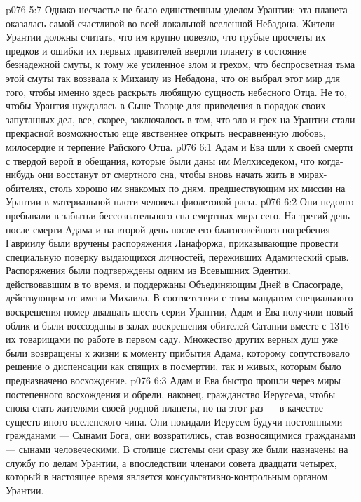 \vs p076 5:7 Однако несчастье не было единственным уделом Урантии; эта планета оказалась самой счастливой во всей локальной вселенной Небадона. Жители Урантии должны считать, что им крупно повезло, что грубые просчеты их предков и ошибки их первых правителей ввергли планету в состояние безнадежной смуты, к тому же усиленное злом и грехом, что беспросветная тьма этой смуты так воззвала к Михаилу из Небадона, что он выбрал этот мир для того, чтобы именно здесь раскрыть любящую сущность небесного Отца. Не то, чтобы Урантия нуждалась в Сыне\hyp{}Творце для приведения в порядок своих запутанных дел, все, скорее, заключалось в том, что зло и грех на Урантии стали прекрасной возможностью еще явственнее открыть несравненную любовь, милосердие и терпение Райского Отца.
\vs p076 6:1 Адам и Ева шли к своей смерти с твердой верой в обещания, которые были даны им Мелхиседеком, что когда\hyp{}нибудь они восстанут от смертного сна, чтобы вновь начать жить в мирах\hyp{}обителях, столь хорошо им знакомых по дням, предшествующим их миссии на Урантии в материальной плоти человека фиолетовой расы.
\vs p076 6:2 Они недолго пребывали в забытьи бессознательного сна смертных мира сего. На третий день после смерти Адама и на второй день после его благоговейного погребения Гавриилу были вручены распоряжения Ланафоржа, приказывающие провести специальную поверку выдающихся личностей, переживших Адамический срыв. Распоряжения были подтверждены одним из Всевышних Эдентии, действовавшим в то время, и поддержаны Объединяющим Дней в Спасограде, действующим от имени Михаила. В соответствии с этим мандатом специального воскрешения номер двадцать шесть серии Урантии, Адам и Ева получили новый облик и были воссозданы в залах воскрешения обителей Сатании вместе с 1316 их товарищами по работе в первом саду. Множество других верных душ уже были возвращены к жизни к моменту прибытия Адама, которому сопутствовало решение о диспенсации как спящих в посмертии, так и живых, которым было предназначено восхождение.
\vs p076 6:3 \pc Адам и Ева быстро прошли через миры постепенного восхождения и обрели, наконец, гражданство Иерусема, чтобы снова стать жителями своей родной планеты, но на этот раз --- в качестве существ иного вселенского чина. Они покидали Иерусем будучи постоянными гражданами --- Сынами Бога, они возвратились, став возносящимися гражданами --- сынами человеческими. В столице системы они сразу же были назначены на службу по делам Урантии, а впоследствии членами совета двадцати четырех, который в настоящее время является консультативно\hyp{}контрольным органом Урантии.
